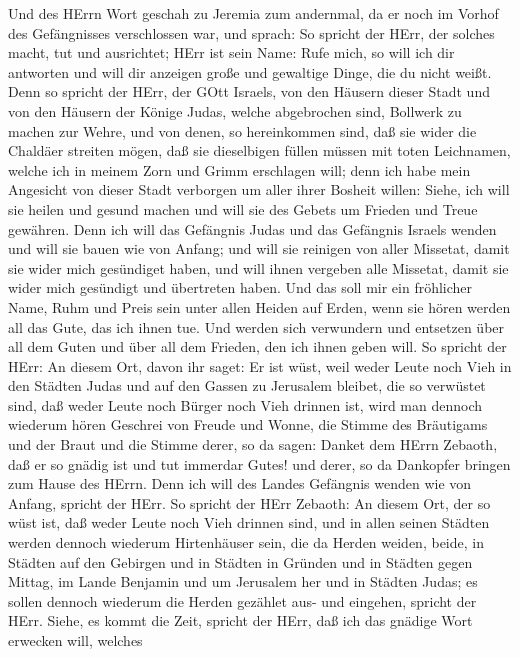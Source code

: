  Und des HErrn Wort geschah zu Jeremia zum andernmal, da er
noch im Vorhof des Gefängnisses verschlossen war, und sprach:
 So spricht der HErr, der solches macht, tut und ausrichtet;
HErr ist sein Name:  Rufe mich, so will ich dir antworten
und will dir anzeigen große und gewaltige Dinge, die du nicht weißt.
 Denn so spricht der HErr, der GOtt Israels, von den Häusern
dieser Stadt und von den Häusern der Könige Judas, welche abgebrochen
sind, Bollwerk zu machen zur Wehre,  und von denen, so
hereinkommen sind, daß sie wider die Chaldäer streiten mögen, daß sie
dieselbigen füllen müssen mit toten Leichnamen, welche ich in meinem
Zorn und Grimm erschlagen will; denn ich habe mein Angesicht von dieser
Stadt verborgen um aller ihrer Bosheit willen:  Siehe, ich
will sie heilen und gesund machen und will sie des Gebets um Frieden und
Treue gewähren.  Denn ich will das Gefängnis Judas und das
Gefängnis Israels wenden und will sie bauen wie von Anfang; 
und will sie reinigen von aller Missetat, damit sie wider mich
gesündiget haben, und will ihnen vergeben alle Missetat, damit sie wider
mich gesündigt und übertreten haben.  Und das soll mir ein
fröhlicher Name, Ruhm und Preis sein unter allen Heiden auf Erden, wenn
sie hören werden all das Gute, das ich ihnen tue. Und werden sich
verwundern und entsetzen über all dem Guten und über all dem Frieden,
den ich ihnen geben will.  So spricht der HErr: An diesem
Ort, davon ihr saget: Er ist wüst, weil weder Leute noch Vieh in den
Städten Judas und auf den Gassen zu Jerusalem bleibet, die so verwüstet
sind, daß weder Leute noch Bürger noch Vieh drinnen ist, 
wird man dennoch wiederum hören Geschrei von Freude und Wonne, die
Stimme des Bräutigams und der Braut und die Stimme derer, so da sagen:
Danket dem HErrn Zebaoth, daß er so gnädig ist und tut immerdar Gutes!
und derer, so da Dankopfer bringen zum Hause des HErrn. Denn ich will
des Landes Gefängnis wenden wie von Anfang, spricht der HErr.
 So spricht der HErr Zebaoth: An diesem Ort, der so wüst
ist, daß weder Leute noch Vieh drinnen sind, und in allen seinen Städten
werden dennoch wiederum Hirtenhäuser sein, die da Herden weiden,
 beide, in Städten auf den Gebirgen und in Städten in
Gründen und in Städten gegen Mittag, im Lande Benjamin und um Jerusalem
her und in Städten Judas; es sollen dennoch wiederum die Herden gezählet
aus- und eingehen, spricht der HErr.  Siehe, es kommt die
Zeit, spricht der HErr, daß ich das gnädige Wort erwecken will, welches
